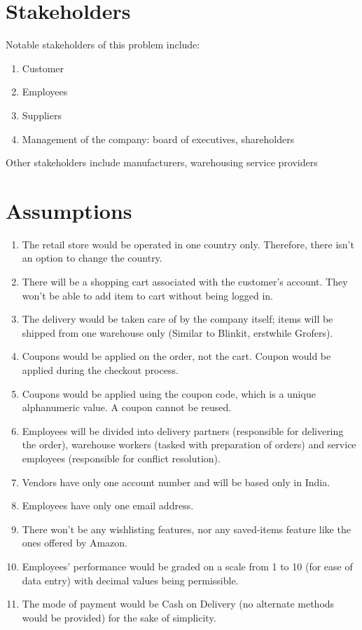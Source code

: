\documentclass[12pt]{report}
\begin{document}
    \section{Stakeholders}
    Notable stakeholders of this problem include:
    \begin{enumerate}
        \item Customer
        \item Employees
        \item Suppliers
        \item Management of the company: board of executives, shareholders
    \end{enumerate}
    Other stakeholders include manufacturers, warehousing service providers
    
    \section{Assumptions}
    \begin{enumerate}
        \item The retail store would be operated in one country only. Therefore, there isn't an option to change the country.
        \item There will be a shopping cart associated with the customer's account. They won't be able to add item to cart without being logged in.
        \item The delivery would be taken care of by the company itself; items will be shipped from one warehouse only (Similar to Blinkit, erstwhile Grofers).
        \item Coupons would be applied on the order, not the cart. Coupon would be applied during the checkout process.
        \item Coupons would be applied using the coupon code, which is a unique alphanumeric value. A coupon cannot be reused.
        \item Employees will be divided into delivery partners (responsible for delivering the order), warehouse workers (tasked with preparation of orders) and service employees (responsible for conflict resolution).
        \item Vendors have only one account number and will be based only in India.
        \item Employees have only one email address.
        \item There won't be any wishlisting features, nor any saved-items feature like the ones offered by Amazon.
        \item Employees' performance would be graded on a scale from 1 to 10 (for ease of data entry) with decimal values being permissible.
        \item The mode of payment would be Cash on Delivery (no alternate methods would be provided) for the sake of simplicity.
    \end{enumerate}
\end{document}
